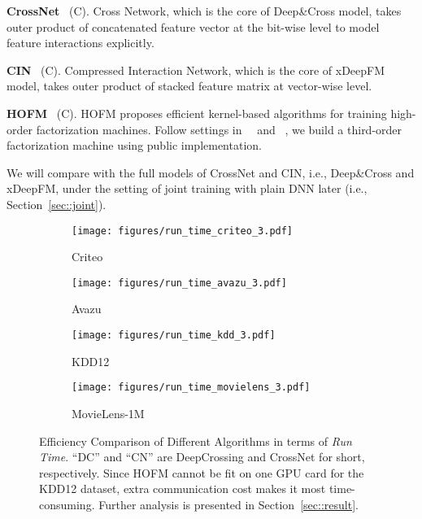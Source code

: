 \textbf{CrossNet}~\cite{wang2017deep} (C). Cross Network, which is the core of Deep\&Cross model, takes outer product of concatenated feature vector at the bit-wise level to model feature interactions explicitly.

\textbf{CIN}~\cite{lian2018xdeepfm} (C). Compressed Interaction Network, which is the core of xDeepFM model, takes outer product of stacked feature matrix at vector-wise level.

\textbf{HOFM}~\cite{blondel2016higher} (C). HOFM proposes efficient kernel-based algorithms for training high-order factorization machines. Follow settings in~\citeauthor{blondel2016higher}~\cite{blondel2016higher} and \citeauthor{he2017neural}~\cite{he2017neural}, we build a third-order factorization machine using public implementation.

We will compare with the full models of CrossNet and CIN, i.e., Deep\&Cross and xDeepFM, under the setting of joint training with plain DNN later (i.e., Section~\ref{sec::joint}).




\begin{figure*}
\centering
  \begin{subfigure}[b]{0.24\linewidth}
    \texttt{[image: figures/run\_time\_criteo\_3.pdf]}
    \caption{Criteo}
  \end{subfigure}
  \begin{subfigure}[b]{0.24\linewidth}
    \texttt{[image: figures/run\_time\_avazu\_3.pdf]}
    \caption{Avazu}
  \end{subfigure}
  \begin{subfigure}[b]{0.24\linewidth}
    \texttt{[image: figures/run\_time\_kdd\_3.pdf]}
    \caption{KDD12}
  \end{subfigure}
  \begin{subfigure}[b]{0.24\linewidth}
    \texttt{[image: figures/run\_time\_movielens\_3.pdf]}
    \caption{MovieLens-1M}
  \end{subfigure}
  \caption{Efficiency Comparison of Different Algorithms in terms of \textit{Run Time}. ``DC'' and ``CN'' are DeepCrossing and CrossNet for short, respectively. Since HOFM cannot be fit on one GPU card for the KDD12 dataset, extra communication cost makes it most time-consuming. Further analysis is presented in Section~\ref{sec::result}.}\label{fig::run_time}
  \vspace{-8pt}
\end{figure*}



